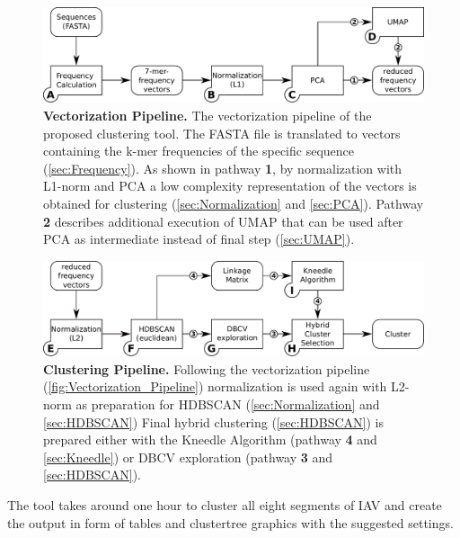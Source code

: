 \begin{figure}[!hbt]
    \centering
    \includegraphics[width=\textwidth]{Graphics/Vectorization.pdf}
    \caption[Clustering Pipeline]{\textbf{Vectorization Pipeline.} The vectorization pipeline of the proposed clustering tool. The FASTA file is translated to vectors containing the k-mer frequencies of the specific sequence (\autoref{sec:Frequency}). As shown in pathway \textsf{\textbf{1}}, by normalization with L1-norm and \gls{PCA} a low complexity representation of the vectors is obtained for clustering (\autoref{sec:Normalization} and \autoref{sec:PCA}). Pathway \textsf{\textbf{2}} describes additional execution of \gls{UMAP} that can be used after \gls{PCA} as intermediate instead of final step (\autoref{sec:UMAP}).}
    \label{fig:Vectorization_Pipeline}
\end{figure}

\begin{figure}[!hbt]
    \centering
    \includegraphics[width=\textwidth]{Graphics/Clustering.pdf}
    \caption[Clustering Pipeline]{\textbf{Clustering Pipeline.} Following the vectorization pipeline (\autoref{fig:Vectorization_Pipeline}) normalization is used again with L2-norm as preparation for \gls{HDBSCAN} (\autoref{sec:Normalization} and \autoref{sec:HDBSCAN}) Final hybrid clustering (\autoref{sec:HDBSCAN}) is prepared either with the Kneedle Algorithm (pathway \textsf{\textbf{4}} and \autoref{sec:Kneedle}) or DBCV exploration (pathway \textsf{\textbf{3}} and \autoref{sec:HDBSCAN}).}
    \label{fig:Clustering_Pipeline}
\end{figure}

The tool takes around one hour to cluster all eight segments of \gls{IAV} and create the output in form of tables and clustertree graphics with the suggested settings. 













